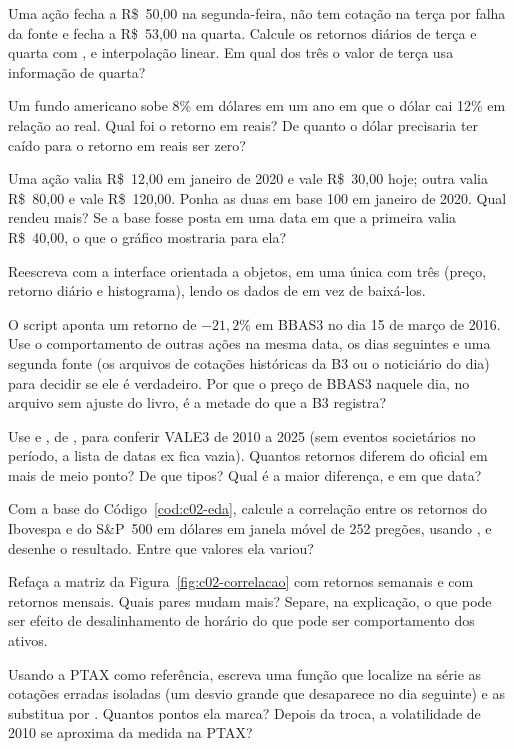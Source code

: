 \begin{exercicios}
  \item {} Uma ação fecha a R\$~50,00 na segunda-feira, não tem cotação na terça por falha da fonte e fecha a R\$~53,00 na quarta. Calcule os retornos diários de terça e quarta com ,  e interpolação linear. Em qual dos três o valor de terça usa informação de quarta?
  \item {} Um fundo americano sobe 8\% em dólares em um ano em que o dólar cai 12\% em relação ao real. Qual foi o retorno em reais? De quanto o dólar precisaria ter caído para o retorno em reais ser zero?
  \item {} Uma ação valia R\$~12,00 em janeiro de 2020 e vale R\$~30,00 hoje; outra valia R\$~80,00 e vale R\$~120,00. Ponha as duas em base 100 em janeiro de 2020. Qual rendeu mais? Se a base fosse posta em uma data em que a primeira valia R\$~40,00, o que o gráfico mostraria para ela?
  \item {} Reescreva  com a interface orientada a objetos, em uma única  com três  (preço, retorno diário e histograma), lendo os dados de  em vez de baixá-los.
  \item {} \label{exe:c02-bbas3} O script  aponta um retorno de $-21,2\%$ em BBAS3 no dia 15 de março de 2016. Use o comportamento de outras ações na mesma data, os dias seguintes e uma segunda fonte (os arquivos de cotações históricas da B3 ou o noticiário do dia) para decidir se ele é verdadeiro. Por que o preço de BBAS3 naquele dia, no arquivo sem ajuste do livro, é a metade do que a B3 registra?
  \item {} \label{exe:c02-conferir} Use  e , de , para conferir VALE3 de 2010 a 2025 (sem eventos societários no período, a lista  de datas ex fica vazia). Quantos retornos diferem do oficial em mais de meio ponto? De que tipos? Qual é a maior diferença, e em que data?
  \item {} \label{exe:c02-corr-movel} Com a base do Código~\ref{cod:c02-eda}, calcule a correlação entre os retornos do Ibovespa e do S\&P~500 em dólares em janela móvel de 252 pregões, usando , e desenhe o resultado. Entre que valores ela variou?
  \item {} Refaça a matriz da Figura~\ref{fig:c02-correlacao} com retornos semanais e com retornos mensais. Quais pares mudam mais? Separe, na explicação, o que pode ser efeito de desalinhamento de horário do que pode ser comportamento dos ativos.
  \item {} Usando a PTAX como referência, escreva uma função que localize na série  as cotações erradas isoladas (um desvio grande que desaparece no dia seguinte) e as substitua por . Quantos pontos ela marca? Depois da troca, a volatilidade de 2010 se aproxima da medida na PTAX?
\end{exercicios}

